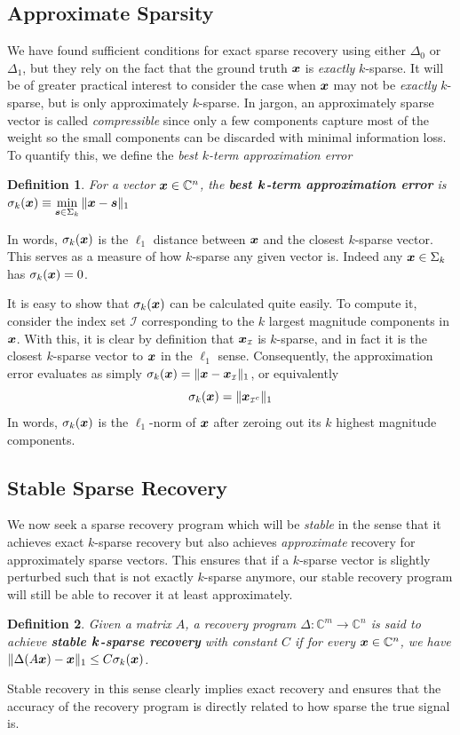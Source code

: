 \documentclass[twocolumn]{gwclass}
\newtheorem{definition}{Definition}
\newcommand{\C}{\mathbb{C}}
\begin{document}
	\subsection{Approximate Sparsity}
	We have found sufficient conditions for exact sparse recovery using either $\Delta_0$ or $\Delta_1$, but they rely on the fact that the ground truth $\boldsymbol{x}$ is \emph{exactly} $k$-sparse. It will be of greater practical interest to consider the case when $\boldsymbol{x}$ may not be \emph{exactly} $k$-sparse, but is only approximately $k$-sparse. In jargon, an approximately sparse vector is called \emph{compressible} since only a few components capture most of the weight so the small components can be discarded with minimal information loss. To quantify this, we define the \emph{best $k$-term approximation error}
	\begin{definition}
		For a vector $\*x\in\C^n$, the \textbf{best $\boldsymbol{k}$-term approximation error} is
		$\displaystyle \sigma_k(\boldsymbol{x})\equiv \min_{\boldsymbol{s}\in\Sigma_k}\|\boldsymbol{x}-\boldsymbol{s}\|_1 $
	\end{definition}

	In words, $\sigma_k(\boldsymbol{x})$ is the $\ell_1$ distance between $\boldsymbol{x}$ and the closest $k$-sparse vector. This serves as a measure of how $k$-sparse any given vector is. Indeed any $\boldsymbol{x}\in\Sigma_k$ has $\sigma_k(\boldsymbol{x})=0$.
	
	It is easy to show that $\sigma_k(\boldsymbol{x})$ can be calculated quite easily. To compute it, consider the index set $\mathcal{I}$ corresponding to the $k$ largest magnitude components in $\boldsymbol{x}$. With this, it is clear by definition that $\boldsymbol{x}_{\scriptscriptstyle\mathcal{I}}$ is $k$-sparse, and in fact it is the closest $k$-sparse vector to $\boldsymbol{x}$ in the $\ell_1$ sense. Consequently, the approximation error evaluates as simply $\sigma_k(\boldsymbol{x})=\|\boldsymbol{x}-\boldsymbol{x}_{\scriptscriptstyle\mathcal{I}}\|_1$, or equivalently
	$$ \sigma_k(\boldsymbol{x}) = \|\boldsymbol{x}_{\scriptscriptstyle\mathcal{I}^c}\|_1 $$
	In words, $\sigma_k(\boldsymbol{x})$ is the $\ell_1$-norm of $\boldsymbol{x}$ after zeroing out its $k$ highest magnitude components.
	

	
	\subsection{Stable Sparse Recovery}
	We now seek a sparse recovery program which will be \emph{stable} in the sense that it achieves exact $k$-sparse recovery but also achieves \emph{approximate} recovery for approximately sparse vectors. This ensures that if a $k$-sparse vector is slightly perturbed such that is not exactly $k$-sparse anymore, our stable recovery program will still be able to recover it at least approximately. 
	\begin{definition}
		Given a matrix $A$, a recovery program $\Delta:\C^m\to\C^n$ is said to achieve \textbf{stable $\boldsymbol{k}$-sparse recovery} with constant $C$ if for every $\*x\in \C^n$, we have $ \|\Delta(A\boldsymbol{x}) - \boldsymbol{x}\|_1 \leq C \sigma_k(\boldsymbol{x}) $.
	\end{definition}
	Stable recovery in this sense clearly implies exact recovery and ensures that the accuracy of the recovery program is directly related to how sparse the true signal is. 
	
\end{document}
